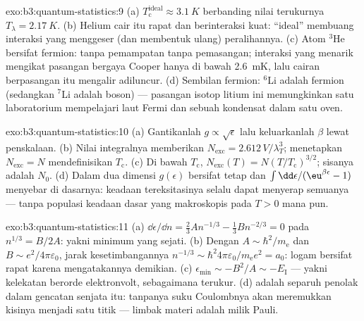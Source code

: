 \begin{solution}{exo:b3:quantum-statistics:9}
(a) $T_{\text{c}}^{\text{ideal}} \approx \qty{3.1}{K}$ berbanding
nilai terukurnya $T_\lambda = \qty{2.17}{K}$. (b) Helium cair itu rapat
dan berinteraksi kuat: ``ideal'' membuang interaksi yang
menggeser (dan membentuk ulang) peralihannya. (c) Atom $^3$He bersifat fermion:
tanpa pemampatan tanpa pemasangan; interaksi yang menarik mengikat
pasangan bergaya Cooper hanya di bawah \qty{2.6}{mK}, lalu cairan
berpasangan itu mengalir adiluncur. (d) Sembilan fermion: $^6$Li adalah fermion (sedangkan
$^7$Li adalah boson) --- pasangan isotop litium ini memungkinkan satu
laboratorium mempelajari laut Fermi dan sebuah kondensat dalam satu oven.
\end{solution}

\begin{solution}{exo:b3:quantum-statistics:10}
(a) Gantikanlah $g \propto \sqrt\epsilon$ lalu keluarkanlah $\beta$ lewat penskalaan.
(b) Nilai integralnya memberikan $N_{\text{exc}} =
2.612\,V/\lambda_T^3$; menetapkan $N_{\text{exc}} = N$ mendefinisikan
$T_{\text{c}}$. (c) Di bawah $T_{\text{c}}$, $N_{\text{exc}}(T) =
N(T/T_{\text{c}})^{3/2}$; sisanya adalah $N_0$. (d) Dalam dua
dimensi $g(\epsilon)$ bersifat tetap dan $\int\dd\epsilon/(\eu^{
\beta\epsilon} - 1)$ menyebar di dasarnya: keadaan tereksitasinya
selalu dapat menyerap semuanya --- tanpa populasi keadaan dasar yang
makroskopis pada $T > 0$ mana pun.
\end{solution}

\begin{solution}{exo:b3:quantum-statistics:11}
(a) $\dd\epsilon/\dd n = \tfrac23 An^{-1/3} - \tfrac13 Bn^{-2/3} =
0$ pada $n^{1/3} = B/2A$: yakni minimum yang sejati. (b) Dengan $A \sim
\hbar^2/m_{\text{e}}$ dan $B \sim e^2/4\pi\varepsilon_0$, jarak
kesetimbangannya $n^{-1/3} \sim \hbar^2 4\pi\varepsilon_0/
m_{\text{e}}e^2 = a_0$: logam bersifat rapat karena 
mengatakannya demikian. (c) $\epsilon_{\min} \sim -B^2/A \sim -E_{\text{I}}$
--- yakni kelekatan berorde elektronvolt, sebagaimana terukur. (d)  adalah separuh penolak dalam gencatan senjata itu: tanpanya
suku Coulombnya akan meremukkan kisinya menjadi satu titik --- limbak
materi adalah milik Pauli.
\end{solution}


